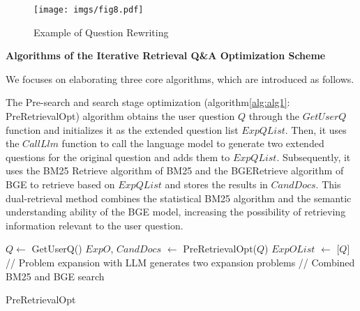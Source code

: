 \begin{figure} [h] \small
    \centering
    \texttt{[image: imgs/fig8.pdf]}
    \vspace{-5pt}
    \caption{Example of Question Rewriting}
    \label{fig:fig8}
\end{figure}

\textbf{Algorithms of the Iterative Retrieval Q\&A Optimization Scheme}

We focuses on elaborating three core algorithms, which are introduced as follows.


The Pre-search and search stage optimization (algorithm\ref{alg:alg1}: PreRetrievalOpt) algorithm obtains the user question $Q$ through the $GetUserQ$ function and initializes it as the extended question list $ExpQList$. Then, it uses the $CallLlm$ function to call the language model to generate two extended questions for the original question and adds them to $ExpQList$. Subsequently, it uses the BM25 Retrieve algorithm of BM25 and the BGERetrieve algorithm of BGE to retrieve based on $ExpQList$ and stores the results in $CandDocs$. This dual-retrieval method combines the statistical BM25 algorithm and the semantic understanding ability of the BGE model, increasing the possibility of retrieving information relevant to the user question.
\begin{algorithm}[h!]
\label{alg:alg1}
\SetAlgoLined
{}
\BlankLine
$Q \leftarrow$ GetUserQ()\;
$ExpO$, $CandDocs$ $\leftarrow$ PreRetrievalOpt($Q$)\;
$ExpOList$ $\leftarrow$ [$Q$]\;
\BlankLine
// Problem expansion with LLM generates two expansion problems
\BlankLine
// {Combined BM25 and BGE search}

\BlankLine
{}\;
\caption{PreRetrievalOpt}
\end{algorithm}

